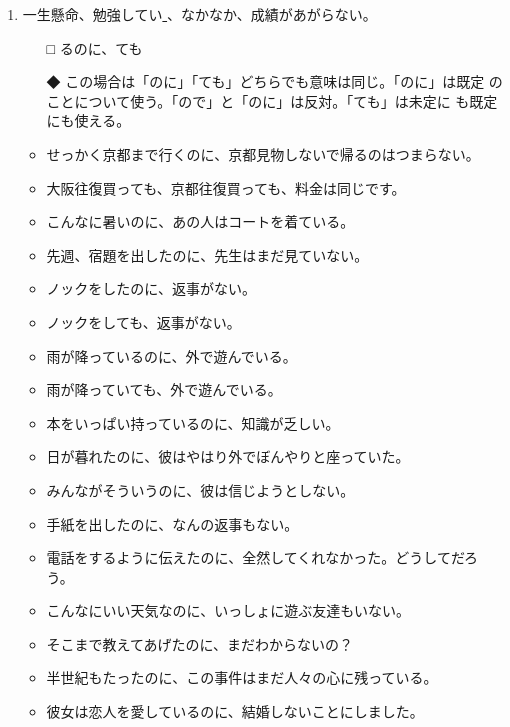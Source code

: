 \documentclass[
uplatex,
b5paper,
10pt,
dvipdfmx
]{jsbook}
\begin{document}
\begin{enumerate}
\item 一生懸命、勉強してい\underline{   }、なかなか、成績があがらない。 
\begin{itemize}
\item[□] るのに、ても
\item[◆] この場合は「のに」「ても」どちらでも意味は同じ。「のに」は既定
	  のことについて使う。「ので」と「のに」は反対。「ても」は未定に
	  も既定にも使える。
\end{itemize}
\begin{itemize}
\item せっかく京都まで行くのに、京都見物しないで帰るのはつまらない。
\item 大阪往復買っても、京都往復買っても、料金は同じです。
\item こんなに暑いのに、あの人はコートを着ている。
\item 先週、宿題を出したのに、先生はまだ見ていない。
\item ノックをしたのに、返事がない。
\item ノックをしても、返事がない。
\item 雨が降っているのに、外で遊んでいる。
\item 雨が降っていても、外で遊んでいる。
\item 本をいっぱい持っているのに、知識が乏しい。
\item 日が暮れたのに、彼はやはり外でぼんやりと座っていた。
\item みんながそういうのに、彼は信じようとしない。
\item 手紙を出したのに、なんの返事もない。
\item 電話をするように伝えたのに、全然してくれなかった。どうしてだろう。
\item こんなにいい天気なのに、いっしょに遊ぶ友達もいない。
\item そこまで教えてあげたのに、まだわからないの？
\item 半世紀もたったのに、この事件はまだ人々の心に残っている。
\item 彼女は恋人を愛しているのに、結婚しないことにしました。
\end{itemize}


\end{enumerate}
\end{document}
